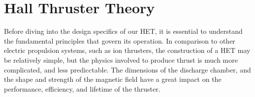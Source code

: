 \chapter{Hall Thruster Theory}

Before diving into the design specifics of our \ac{HET}, it is essential to understand the fundamental principles that govern its operation. In comparison to other electric propulsion systems, such as ion thrusters, the construction of a \ac{HET} may be relatively simple, but the physics involved to produce thrust is much more complicated, and less predicctable. The dimensions of the discharge chamber, and the shape and strength of the magnetic field have a great impact on the performance, efficiency, and lifetime of the thruster.